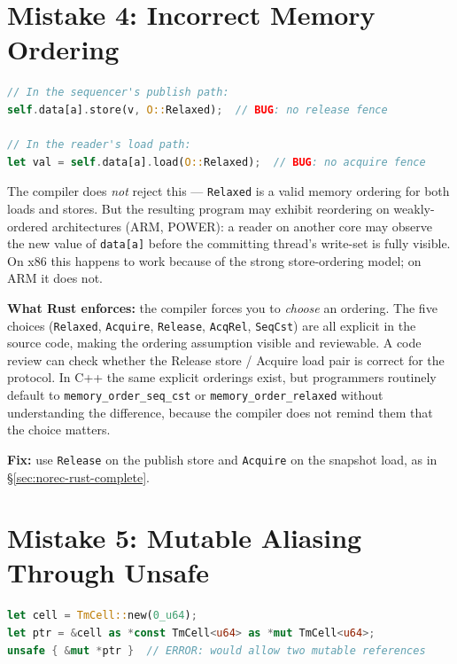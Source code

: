 \section*{Mistake 4: Incorrect Memory Ordering}

\begin{lstlisting}[language=Rust, caption={Using \texttt{Relaxed} where \texttt{Acquire}/\texttt{Release} is required.}]
// In the sequencer's publish path:
self.data[a].store(v, O::Relaxed);  // BUG: no release fence

// In the reader's load path:
let val = self.data[a].load(O::Relaxed);  // BUG: no acquire fence
\end{lstlisting}

The compiler does \emph{not} reject this --- \texttt{Relaxed} is a valid
memory ordering for both loads and stores. But the resulting program may
exhibit reordering on weakly-ordered architectures (ARM, POWER): a reader
on another core may observe the new value of \texttt{data[a]} before the
committing thread's write-set is fully visible. On x86 this happens to
work because of the strong store-ordering model; on ARM it does not.

\textbf{What Rust enforces:} the compiler forces you to \emph{choose} an
ordering. The five choices (\texttt{Relaxed}, \texttt{Acquire},
\texttt{Release}, \texttt{AcqRel}, \texttt{SeqCst}) are all explicit in
the source code, making the ordering assumption visible and reviewable. A
code review can check whether the Release store / Acquire load pair is
correct for the protocol. In C++ the same explicit orderings exist, but
programmers routinely default to \texttt{memory\_order\_seq\_cst} or
\texttt{memory\_order\_relaxed} without understanding the difference,
because the compiler does not remind them that the choice matters.

\textbf{Fix:} use \texttt{Release} on the publish store and
\texttt{Acquire} on the snapshot load, as in \S\ref{sec:norec-rust-complete}.

\section*{Mistake 5: Mutable Aliasing Through Unsafe}

\begin{lstlisting}[language=Rust, caption={Bypassing the borrow checker to share a cell.}]
let cell = TmCell::new(0_u64);
let ptr = &cell as *const TmCell<u64> as *mut TmCell<u64>;
unsafe { &mut *ptr }  // ERROR: would allow two mutable references
\end{lstlisting}

